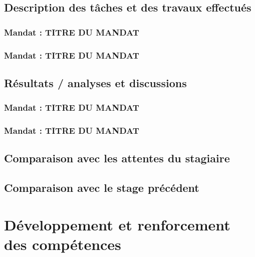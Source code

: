 \documentclass[12pt]{article} 	%
\begin{document}
\subsection{Description des tâches et des travaux effectués}

\subsubsection{Mandat : TITRE DU MANDAT}

\subsubsection{Mandat : TITRE DU MANDAT}

\subsection{Résultats / analyses et discussions}

\subsubsection{Mandat : TITRE DU MANDAT}

\subsubsection{Mandat : TITRE DU MANDAT}

\subsection{Comparaison avec les attentes du stagiaire}

\subsection{Comparaison avec le stage précédent}

\newpage
\section{Développement et renforcement des compétences}
\end{document}
